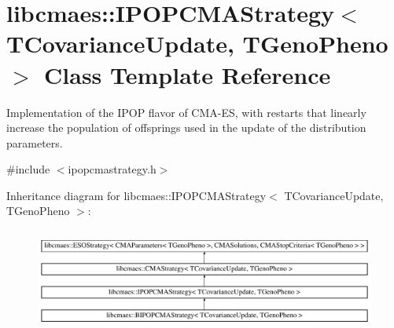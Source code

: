 \hypertarget{classlibcmaes_1_1IPOPCMAStrategy}{\section{libcmaes\+:\+:I\+P\+O\+P\+C\+M\+A\+Strategy$<$ T\+Covariance\+Update, T\+Geno\+Pheno $>$ Class Template Reference}
\label{classlibcmaes_1_1IPOPCMAStrategy}
}


Implementation of the I\+P\+O\+P flavor of C\+M\+A-\/\+E\+S, with restarts that linearly increase the population of offsprings used in the update of the distribution parameters.  




{\ttfamily \#include $<$ipopcmastrategy.\+h$>$}

Inheritance diagram for libcmaes\+:\+:I\+P\+O\+P\+C\+M\+A\+Strategy$<$ T\+Covariance\+Update, T\+Geno\+Pheno $>$\+:\begin{figure}[H]
\begin{center}
\leavevmode
\includegraphics[height=3.430321cm]{classlibcmaes_1_1IPOPCMAStrategy}
\end{center}
\end{figure}
